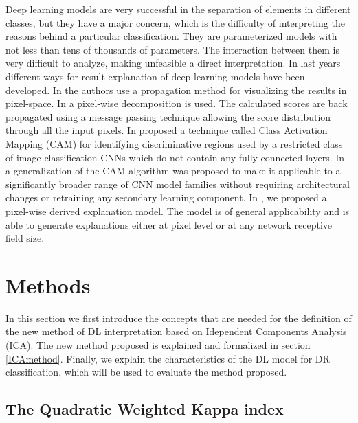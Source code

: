 \documentclass[review]{elsarticle}
\theoremstyle{definition} %
\theoremstyle{remark}
\begin{document}
Deep learning models are very successful in the separation of elements in different classes, but they have a major concern, which is the difficulty of interpreting the reasons behind a particular classification. They are parameterized models with not less than tens of thousands of parameters. The interaction between them is very difficult to analyze, making unfeasible a direct interpretation. In last years different ways for result explanation of deep learning models have been developed. In \cite{zeiler2014visualizing} the authors use a propagation method for visualizing the results in pixel-space. In \cite{bach2015pixel} a pixel-wise decomposition is used. The calculated scores are back propagated using a message passing technique allowing the score distribution through all the input pixels. In \cite{zhou2016learning} proposed a technique called Class Activation Mapping (CAM) for identifying discriminative regions used by a restricted class of image classification CNNs which do not contain any fully-connected layers. In \cite{selvaraju2017grad} a generalization of the CAM algorithm was proposed to make it applicable to a significantly broader range of CNN model families without requiring architectural changes or retraining any secondary learning component. In \cite{de2017deep}, we proposed a pixel-wise derived explanation model. The model is of general applicability and is able to generate explanations either at pixel level or at any network receptive field size.


\section{Methods}\label{sec:methods}

In this section we first introduce the concepts that are needed for the definition of the new method of DL interpretation based on Idependent Components Analysis (ICA). The new method proposed is explained and formalized in section \ref{ICAmethod}. Finally, we explain the characteristics of the DL model for DR classification, which will be used to evaluate the method proposed. 

\subsection{The Quadratic Weighted Kappa index}
\end{document}
